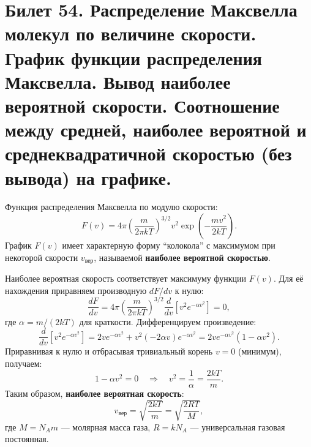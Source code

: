 \section{Билет 54. Распределение Максвелла молекул по величине скорости. График функции распределения Максвелла. Вывод наиболее вероятной скорости. Соотношение между средней, наиболее вероятной и среднеквадратичной скоростью (без вывода) на графике.}

\begin{definition}
Функция распределения Максвелла по модулю скорости:
\begin{equation}
    F(v) = 4\pi \left( \frac{m}{2\pi k T} \right)^{3/2} v^2 \exp\left( -\frac{m v^2}{2 k T} \right). \label{eq:maxwell_speed_54}
\end{equation}
График $F(v)$ имеет характерную форму ``колокола'' с максимумом при некоторой скорости $v_{\text{вер}}$, называемой \textbf{наиболее вероятной скоростью}.
\end{definition}

\begin{theorem}
Наиболее вероятная скорость соответствует максимуму функции $F(v)$. Для её нахождения приравняем производную $dF/dv$ к нулю:
\begin{equation}
    \frac{dF}{dv} = 4\pi \left( \frac{m}{2\pi k T} \right)^{3/2} \frac{d}{dv} \left[ v^2 e^{-\alpha v^2} \right] = 0,
\end{equation}
где $\alpha = m/(2kT)$ для краткости. Дифференцируем произведение:
\begin{equation}
    \frac{d}{dv} \left[ v^2 e^{-\alpha v^2} \right] = 2v e^{-\alpha v^2} + v^2 (-2\alpha v) e^{-\alpha v^2} = 2v e^{-\alpha v^2} (1 - \alpha v^2).
\end{equation}
Приравнивая к нулю и отбрасывая тривиальный корень $v = 0$ (минимум), получаем:
\begin{equation}
    1 - \alpha v^2 = 0 \quad \Rightarrow \quad v^2 = \frac{1}{\alpha} = \frac{2kT}{m}.
\end{equation}
Таким образом, \textbf{наиболее вероятная скорость}:
\begin{equation}
    v_{\text{вер}} = \sqrt{\frac{2kT}{m}} = \sqrt{\frac{2RT}{M}}, \label{eq:v_most_probable}
\end{equation}
где $M = N_A m$ --- молярная масса газа, $R = k N_A$ --- универсальная газовая постоянная.
\end{theorem}

